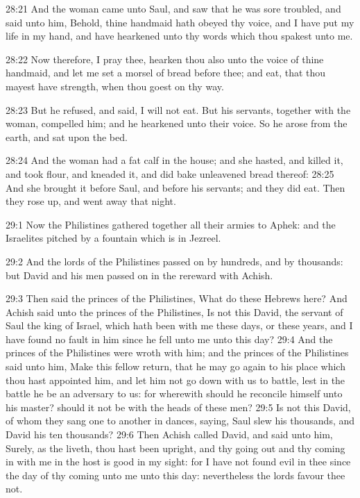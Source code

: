 28:21 And the woman came unto Saul, and saw that he was sore troubled,
and said unto him, Behold, thine handmaid hath obeyed thy voice, and I
have put my life in my hand, and have hearkened unto thy words which
thou spakest unto me.

28:22 Now therefore, I pray thee, hearken thou also unto the voice of
thine handmaid, and let me set a morsel of bread before thee; and eat,
that thou mayest have strength, when thou goest on thy way.

28:23 But he refused, and said, I will not eat. But his servants,
together with the woman, compelled him; and he hearkened unto their
voice. So he arose from the earth, and sat upon the bed.

28:24 And the woman had a fat calf in the house; and she hasted, and
killed it, and took flour, and kneaded it, and did bake unleavened
bread thereof: 28:25 And she brought it before Saul, and before his
servants; and they did eat. Then they rose up, and went away that
night.

29:1 Now the Philistines gathered together all their armies to Aphek:
and the Israelites pitched by a fountain which is in Jezreel.

29:2 And the lords of the Philistines passed on by hundreds, and by
thousands: but David and his men passed on in the rereward with
Achish.

29:3 Then said the princes of the Philistines, What do these Hebrews
here?  And Achish said unto the princes of the Philistines, Is not
this David, the servant of Saul the king of Israel, which hath been
with me these days, or these years, and I have found no fault in him
since he fell unto me unto this day?  29:4 And the princes of the
Philistines were wroth with him; and the princes of the Philistines
said unto him, Make this fellow return, that he may go again to his
place which thou hast appointed him, and let him not go down with us
to battle, lest in the battle he be an adversary to us: for wherewith
should he reconcile himself unto his master? should it not be with the
heads of these men?  29:5 Is not this David, of whom they sang one to
another in dances, saying, Saul slew his thousands, and David his ten
thousands?  29:6 Then Achish called David, and said unto him, Surely,
as the \LORD liveth, thou hast been upright, and thy going out and thy
coming in with me in the host is good in my sight: for I have not
found evil in thee since the day of thy coming unto me unto this day:
nevertheless the lords favour thee not.


